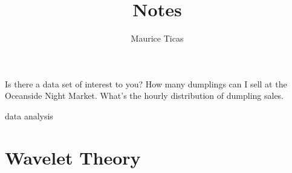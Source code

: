 \documentclass[12pt]{amsart} \usepackage{amscd} \usepackage{epsfig}
\begin{document}
\title{Notes}

\author{Maurice Ticas}
\maketitle

Is there a data set of interest to you?
How many dumplings can I sell at the Oceanside Night Market.  What's the hourly distribution of dumpling sales.

data analysis 

\section{Wavelet Theory}
\label{sec:theory}
\end{document}
